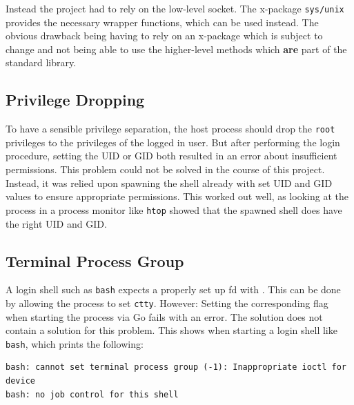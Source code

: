 \documentclass[10pt,a4paper,titlepage,twoside,english,final]{zhawreprt}
\begin{document}
Instead the project had to rely on the low-level \gls{socket}.
The \gls{x-package} \texttt{sys/unix} provides the necessary wrapper functions, which can be used instead.
The obvious drawback being having to rely on an \gls{x-package} which is subject to change and not being able to use the higher-level methods which \textbf{are} part of the standard library.

\subsection{Privilege Dropping}\label{ssec:PrivilegeDropping}
To have a sensible privilege separation, the host process should drop the \texttt{root} privileges to the privileges of the logged in user.
But after performing the \gls{login} procedure, setting the \gls{UID} or \gls{GID} both resulted in an error about insufficient permissions.
This problem could not be solved in the course of this project.
Instead, it was relied upon spawning the \gls{shell} already with set \gls{UID} and \gls{GID} values to ensure appropriate permissions.
This worked out well, as looking at the process in a process monitor like \texttt{htop} showed that the spawned \gls{shell} does have the right \gls{UID} and \gls{GID}.

\subsection{Terminal Process Group}\label{ssec:TerminalProcessGroup}
A \gls{login} \gls{shell} such as \texttt{bash} expects a properly set up \gls{fd} with \cite{ioctl}.
This can be done by allowing the process to set \texttt{ctty}.
However: Setting the corresponding flag when starting the process via \gls{Go} fails with an error.
The solution does not contain a solution for this problem.
This shows when starting a \gls{login} \gls{shell} like \texttt{bash}, which prints the following:

\setlistingBash
\begin{lstlisting}[caption={\texttt{bash} error when starting \gls{shell} without the \texttt{setctty} flag},label=lst:BashIoctlError,deletekeywords={set,for}]
bash: cannot set terminal process group (-1): Inappropriate ioctl for device
bash: no job control for this shell
\end{lstlisting}
\end{document}
